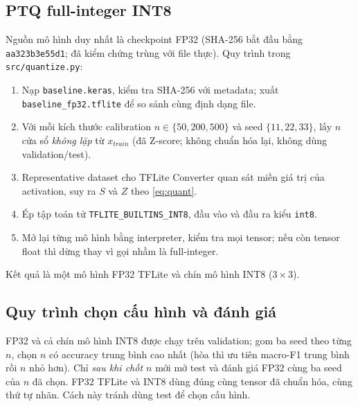 \documentclass[12pt,a4paper]{article}
\newcommand{\code}[1]{\texttt{#1}}
\begin{document}
\subsection{PTQ full-integer INT8}
Nguồn mô hình duy nhất là checkpoint FP32 (SHA-256 bắt đầu bằng \code{aa323b3e55d1}; đã kiểm chứng trùng với file thực). Quy trình trong \code{src/quantize.py}:
\begin{enumerate}
  \item Nạp \code{baseline.keras}, kiểm tra SHA-256 với metadata; xuất \code{baseline\_fp32.tflite} để so sánh cùng định dạng file.
  \item Với mỗi kích thước calibration $n\in\{50,200,500\}$ và seed $\{11,22,33\}$, lấy $n$ cửa sổ \emph{không lặp} từ $x_{train}$ (đã Z-score; không chuẩn hóa lại, không dùng validation/test).
  \item Representative dataset cho TFLite Converter quan sát miền giá trị của activation, suy ra $S$ và $Z$ theo \eqref{eq:quant}.
  \item Ép tập toán tử \code{TFLITE\_BUILTINS\_INT8}, đầu vào và đầu ra kiểu \code{int8}.
  \item Mở lại từng mô hình bằng interpreter, kiểm tra mọi tensor; nếu còn tensor float thì dừng thay vì gọi nhầm là full-integer.
\end{enumerate}
Kết quả là một mô hình FP32 TFLite và chín mô hình INT8 ($3\times3$).

\subsection{Quy trình chọn cấu hình và đánh giá}
FP32 và cả chín mô hình INT8 được chạy trên validation; gom ba seed theo từng $n$, chọn $n$ có accuracy trung bình cao nhất (hòa thì ưu tiên macro-F1 trung bình rồi $n$ nhỏ hơn). Chỉ \emph{sau khi chốt $n$} mới mở test và đánh giá FP32 cùng ba seed của $n$ đã chọn. FP32 TFLite và INT8 dùng đúng cùng tensor đã chuẩn hóa, cùng thứ tự nhãn. Cách này tránh dùng test để chọn cấu hình.
\end{document}
